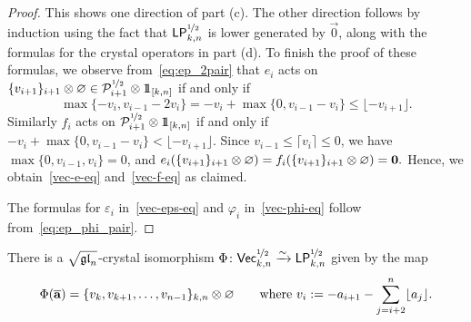 \documentclass[11pt]{article}
\begin{document}
\begin{proof}
This shows one direction of part (c). The other direction follows 
by induction using the fact that $\PCrysR{k}$ is lower generated by $\vec{0}$,
along with the  formulas for the crystal operators in part (d).
To finish the proof of these formulas, we observe from~\eqref{eq:ep_2pair} that $e_i$ acts on $\uj{i+1}{v_{i+1}} \otimes \varnothing \in \sqrtE_{i+1} \otimes \one_{[k,n]}$ if and only if
\begin{equation}
\label{eq:ei_one_action}
\max \{ -v_i, v_{i-1} - 2v_i \} = -v_i + \max\{0, v_{i-1} - v_i\} \leq 
\lfloor -v_{i+1} \rfloor.
\end{equation}
Similarly $f_i$ acts on $\sqrtE_{i+1} \otimes \one_{[k,n]}$ if and only if $-v_i + \max\{0, v_{i-1} - v_i\} < \lfloor -v_{i+1} \rfloor$.
Since $v_{i-1} \leq \lceil v_i \rceil \leq 0$, we have $\max\{0, v_{i-1}, v_i\} = 0$, and 
$
e_i (\uj{i+1}{v_{i+1}} \otimes \varnothing) = f_i (\uj{i+1}{v_{i+1}} \otimes \varnothing) = \zero.
$
Hence, we obtain~\eqref{vec-e-eq} and~\ref{vec-f-eq} as claimed.

The formulas for $\varepsilon_i$ in~\eqref{vec-eps-eq} and $\varphi_i$ in~\eqref{vec-phi-eq} follow from~\eqref{eq:ep_phi_pair}.
\end{proof}

\begin{lemma}\label{lemma:PCrys_structure2}
There is a $\sqgln$-crystal isomorphism
$
\Phi \colon \VCrysR{k} \xrightarrow{\sim} \PCrysR{k}
$
given by the map
\[
\Phi(\overline{\bfa}) = \uj{k,n}{v_k, v_{k+1}, \dotsc, v_{n-1}} \otimes \varnothing
\qquad \text{where }
v_i := -a_{i+1} - \sum_{j=i+2}^n \lfloor a_j \rfloor.
\]
\end{lemma}
\end{document}
